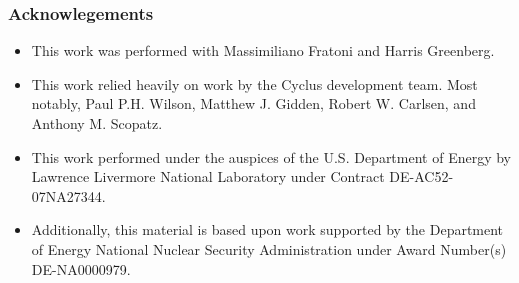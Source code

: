 
\begin{frame}[fragile]
  \frametitle{Acknowlegements}
\begin{itemize}
\item This work was performed with Massimiliano Fratoni and Harris Greenberg.
\item This work relied heavily on work by the Cyclus development team. Most notably, 
Paul P.H. Wilson, Matthew J. Gidden, Robert W. Carlsen, and Anthony M. Scopatz. 
\item This work performed under the auspices of the U.S. Department of Energy by
Lawrence Livermore National Laboratory under Contract DE-AC52-07NA27344.
\item Additionally, this material is based upon work supported by the Department of 
Energy National Nuclear Security Administration under Award Number(s) 
DE-NA0000979. %
\end{itemize}
\end{frame}
